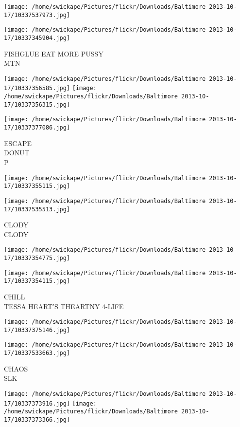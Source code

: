 \documentclass[10pt,letterpaper]{article}
\begin{document}
\texttt{[image: /home/swickape/Pictures/flickr/Downloads/Baltimore 2013-10-17/10337537973.jpg]}

\vspace{0.25in}
\texttt{[image: /home/swickape/Pictures/flickr/Downloads/Baltimore 2013-10-17/10337345904.jpg]}

FISHGLUE EAT MORE PUSSY\\
MTN
\pagebreak

\texttt{[image: /home/swickape/Pictures/flickr/Downloads/Baltimore 2013-10-17/10337356585.jpg]}
\texttt{[image: /home/swickape/Pictures/flickr/Downloads/Baltimore 2013-10-17/10337356315.jpg]}

\vspace{0.25in}
\texttt{[image: /home/swickape/Pictures/flickr/Downloads/Baltimore 2013-10-17/10337377086.jpg]}

ESCAPE\\
DONUT\\
P
\pagebreak

\texttt{[image: /home/swickape/Pictures/flickr/Downloads/Baltimore 2013-10-17/10337355115.jpg]}

\vspace{0.25in}
\texttt{[image: /home/swickape/Pictures/flickr/Downloads/Baltimore 2013-10-17/10337535513.jpg]}

CLODY\\
CLODY
\pagebreak

\texttt{[image: /home/swickape/Pictures/flickr/Downloads/Baltimore 2013-10-17/10337354775.jpg]}

\vspace{0.25in}
\texttt{[image: /home/swickape/Pictures/flickr/Downloads/Baltimore 2013-10-17/10337354115.jpg]}

CHILL\\
TESSA HEART'S THEARTNY 4{-}LIFE
\pagebreak

\texttt{[image: /home/swickape/Pictures/flickr/Downloads/Baltimore 2013-10-17/10337375146.jpg]}

\vspace{0.25in}
\texttt{[image: /home/swickape/Pictures/flickr/Downloads/Baltimore 2013-10-17/10337533663.jpg]}

CHAOS\\
SLK
\pagebreak

\texttt{[image: /home/swickape/Pictures/flickr/Downloads/Baltimore 2013-10-17/10337373916.jpg]}
\texttt{[image: /home/swickape/Pictures/flickr/Downloads/Baltimore 2013-10-17/10337373366.jpg]}
\end{document}
